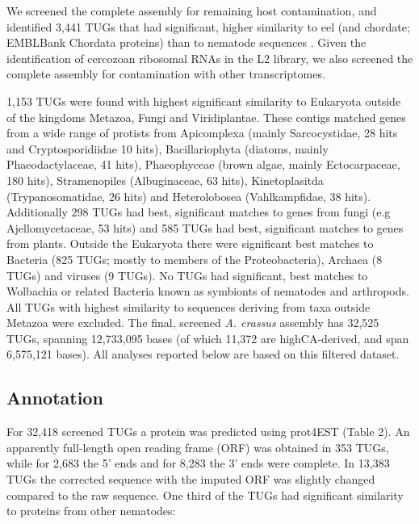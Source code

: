 \documentclass[10pt]{bmc_article}
\newenvironment{bmcformat}{\begin{raggedright}\baselineskip20pt\sloppy\setboolean{publ}{false}}{\end{raggedright}\baselineskip20pt\sloppy}
\begin{document}
\begin{bmcformat}
We screened the complete assembly for remaining host contamination,
and identified 3,441 TUGs that had significant, higher
similarity to eel (and chordate; EMBLBank Chordata proteins) than to
nematode sequences \cite{pmid21550347}. Given the identification of
cercozoan ribosomal RNAs in the L2 library, we also screened the
complete assembly for contamination with other transcriptomes. 

1,153 TUGs were found with highest significant similarity to Eukaryota
outside of the kingdoms Metazoa, Fungi and Viridiplantae. These
contigs matched genes from a wide range of protists from Apicomplexa
(mainly Sarcocystidae, 28 hits and Cryptosporidiidae 10 hits),
Bacillariophyta (diatoms, mainly Phaeodactylaceae, 41 hits),
Phaeophyceae (brown algae, mainly Ectocarpaceae, 180 hits),
Stramenopiles (Albuginaceae, 63 hits), Kinetoplasitda
(Trypanosomatidae, 26 hits) and Heterolobosea (Vahlkampfidae, 38
hits). Additionally 298 TUGs had best,
significant matches to genes from fungi (e.g Ajellomycetaceae, 53
hits) and 585 TUGs had best, significant matches to genes from
plants. Outside the Eukaryota there were significant best matches to
Bacteria (825 TUGs; mostly to members of the Proteobacteria), Archaea
(8 TUGs) and viruses (9 TUGs). No TUGs had significant, best matches
to Wolbachia or related Bacteria known as symbionts of nematodes and
arthropods. All TUGs with highest similarity to sequences deriving
from taxa outside Metazoa were excluded. The final, screened
\textit{A. crassus} assembly has
32,525 TUGs, spanning
12,733,095
bases (of which 11,372 are
highCA-derived, and span
6,575,121
bases). All analyses reported below are based on this filtered
dataset.
















\subsection*{Annotation}

For
32,418
screened TUGs a protein was predicted using prot4EST
\cite{wasmuth_prot4est:_2004} (Table 2). An apparently full-length
open reading frame (ORF) was obtained in
353 TUGs,
while for 2,683
the 5' ends and for
8,283 the 3' ends
were complete. In 13,383 TUGs the corrected
sequence with the imputed ORF was slightly changed compared to the raw
sequence. One third of the TUGs had significant similarity to proteins
from other nematodes:


\end{bmcformat}
\end{document}
